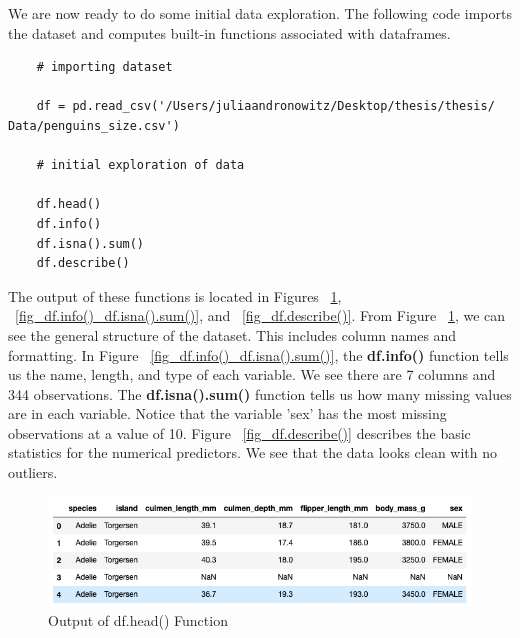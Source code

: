 \documentclass[12pt]{article}
\begin{document}
We are now ready to do some initial data exploration. The following code imports the dataset and computes built-in functions associated with dataframes.

\begin{verbatim}
    # importing dataset

    df = pd.read_csv('/Users/juliaandronowitz/Desktop/thesis/thesis/ Data/penguins_size.csv')

    # initial exploration of data

    df.head()
    df.info()
    df.isna().sum()
    df.describe()
\end{verbatim}

The output of these functions is located in Figures ~\ref{fig_df.head()}, ~\ref{fig_df.info()_df.isna().sum()}, and ~\ref{fig_df.describe()}. From Figure ~\ref{fig_df.head()}, we can see the general structure of the dataset. This includes column names and formatting. In Figure ~\ref{fig_df.info()_df.isna().sum()}, the \textbf{df.info()} function tells us the name, length, and type of each variable. We see there are 7 columns and 344 observations. The \textbf{df.isna().sum()} function tells us how many missing values are in each variable. Notice that the variable 'sex' has the most missing observations at a value of 10. Figure ~\ref{fig_df.describe()} describes the basic statistics for the numerical predictors. We see that the data looks clean with no outliers.

\begin{figure}[H]
    \centering
    \includegraphics[width=5in]{Figures/penguins/df.head().png}
    \caption{Output of df.head() Function}
    \label{fig_df.head()}
\end{figure}
\end{document}
